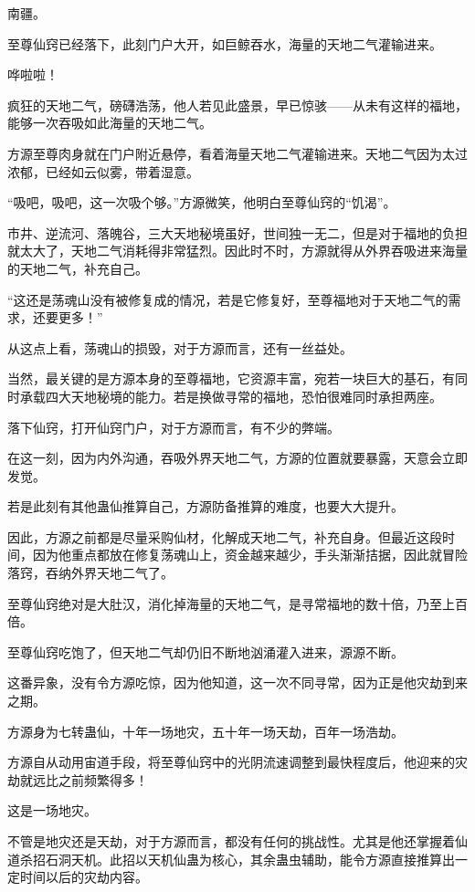 
\begin{this_body}

南疆。

至尊仙窍已经落下，此刻门户大开，如巨鲸吞水，海量的天地二气灌输进来。

哗啦啦！

疯狂的天地二气，磅礴浩荡，他人若见此盛景，早已惊骇——从未有这样的福地，能够一次吞吸如此海量的天地二气。

方源至尊肉身就在门户附近悬停，看着海量天地二气灌输进来。天地二气因为太过浓郁，已经如云似雾，带着湿意。

“吸吧，吸吧，这一次吸个够。”方源微笑，他明白至尊仙窍的“饥渴”。

市井、逆流河、落魄谷，三大天地秘境虽好，世间独一无二，但是对于福地的负担就太大了，天地二气消耗得非常猛烈。因此时不时，方源就得从外界吞吸进来海量的天地二气，补充自己。

“这还是荡魂山没有被修复成的情况，若是它修复好，至尊福地对于天地二气的需求，还要更多！”

从这点上看，荡魂山的损毁，对于方源而言，还有一丝益处。

当然，最关键的是方源本身的至尊福地，它资源丰富，宛若一块巨大的基石，有同时承载四大天地秘境的能力。若是换做寻常的福地，恐怕很难同时承担两座。

落下仙窍，打开仙窍门户，对于方源而言，有不少的弊端。

在这一刻，因为内外沟通，吞吸外界天地二气，方源的位置就要暴露，天意会立即发觉。

若是此刻有其他蛊仙推算自己，方源防备推算的难度，也要大大提升。

因此，方源之前都是尽量采购仙材，化解成天地二气，补充自身。但最近这段时间，因为他重点都放在修复荡魂山上，资金越来越少，手头渐渐拮据，因此就冒险落窍，吞纳外界天地二气了。

至尊仙窍绝对是大肚汉，消化掉海量的天地二气，是寻常福地的数十倍，乃至上百倍。

至尊仙窍吃饱了，但天地二气却仍旧不断地汹涌灌入进来，源源不断。

这番异象，没有令方源吃惊，因为他知道，这一次不同寻常，因为正是他灾劫到来之期。

方源身为七转蛊仙，十年一场地灾，五十年一场天劫，百年一场浩劫。

方源自从动用宙道手段，将至尊仙窍中的光阴流速调整到最快程度后，他迎来的灾劫就远比之前频繁得多！

这是一场地灾。

不管是地灾还是天劫，对于方源而言，都没有任何的挑战性。尤其是他还掌握着仙道杀招石洞天机。此招以天机仙蛊为核心，其余蛊虫辅助，能令方源直接推算出一定时间以后的灾劫内容。


\end{this_body}
